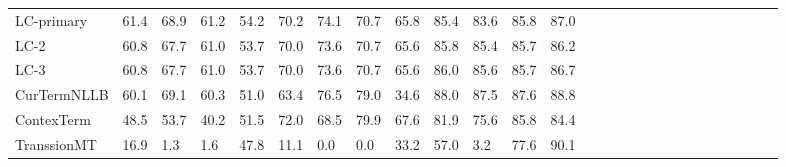 \begin{tabular}{l  cvvv cvvv cvvv|c cvvv cvvv|c cvvv}
LC-primary &  61.4 & 68.9 & 61.2 & 54.2 &  70.2 & 74.1 & 70.7 & 65.8 &  85.4 & 83.6 & 85.8 & 87.0 &  &  &  &  &  &  &  &  &  &  &  &  &  & \\
LC-2 &  60.8 & 67.7 & 61.0 & 53.7 &  70.0 & 73.6 & 70.7 & 65.6 &  85.8 & 85.4 & 85.7 & 86.2 &  &  &  &  &  &  &  &  &  &  &  &  &  & \\
LC-3 &  60.8 & 67.7 & 61.0 & 53.7 &  70.0 & 73.6 & 70.7 & 65.6 &  86.0 & 85.6 & 85.7 & 86.7 &  &  &  &  &  &  &  &  &  &  &  &  &  & \\
CurTermNLLB &  60.1 & 69.1 & 60.3 & 51.0 &  63.4 & 76.5 & 79.0 & 34.6 &  88.0 & 87.5 & 87.6 & 88.8 &  &  &  &  &  &  &  &  &  &  &  &  &  & \\
ContexTerm &  48.5 & 53.7 & 40.2 & 51.5 &  72.0 & 68.5 & 79.9 & 67.6 &  81.9 & 75.6 & 85.8 & 84.4 &  &  &  &  &  &  &  &  &  &  &  &  &  & \\
TranssionMT &  16.9 & 1.3 & 1.6 & 47.8 &  11.1 & 0.0 & 0.0 & 33.2 &  57.0 & 3.2 & 77.6 & 90.1 &  &  &  &  &  &  &  &  &  &  &  &  &  & \\
\bottomrule
\end{tabular}

